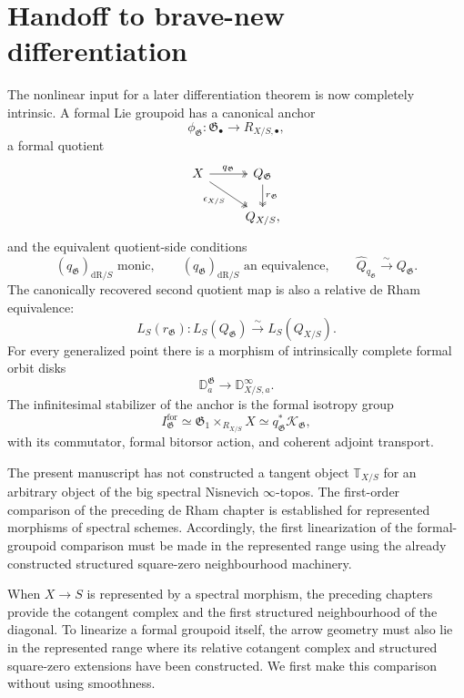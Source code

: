 \section{Handoff to brave-new differentiation}
\label{sec:flg-handoff}

The nonlinear input for a later differentiation theorem is now completely
intrinsic.  A formal Lie groupoid has a canonical anchor
\[
    \phi_{\mathfrak G}:
    \mathfrak G_\bullet
    \longrightarrow
    R_{X/S,\bullet},
\]
a formal quotient
\[
\begin{tikzcd}
X \arrow[r,two heads,"q_{\mathfrak G}"]
  \arrow[dr,two heads,"\epsilon_{X/S}"'] &
Q_{\mathfrak G}
  \arrow[d,two heads,"r_{\mathfrak G}"]\\
&Q_{X/S},
\end{tikzcd}
\]
and the equivalent quotient-side conditions
\[
    (q_{\mathfrak G})_{\mathrm{dR}/S}
    \text{ monic},
    \qquad
    (q_{\mathfrak G})_{\mathrm{dR}/S}
    \text{ an equivalence},
    \qquad
    \widehat Q_{q_{\mathfrak G}}
    \xrightarrow{\sim}
    Q_{\mathfrak G}.
\]
The canonically recovered second quotient map is also a relative de Rham
equivalence:
\[
    L_S(r_{\mathfrak G}):
    L_S(Q_{\mathfrak G})
    \xrightarrow{\sim}
    L_S(Q_{X/S}).
\]
For every generalized point there is a morphism of intrinsically complete
formal orbit disks
\[
    \mathbb D^{\mathfrak G}_a
    \longrightarrow
    \mathbb D^\infty_{X/S,a}.
\]
The infinitesimal stabilizer of the anchor is the formal isotropy group
\[
    I^{\mathrm{for}}_{\mathfrak G}
    \simeq
    \mathfrak G_1\times_{R_{X/S}}X
    \simeq
    q_{\mathfrak G}^*\mathcal K_{\mathfrak G},
\]
with its commutator, formal bitorsor action, and coherent adjoint transport.

The present manuscript has not constructed a tangent object
$\mathbb T_{X/S}$ for an arbitrary object of the big spectral Nisnevich
$\infty$-topos.  The first-order comparison of the preceding de Rham chapter
is established for represented morphisms of spectral schemes.  Accordingly,
the first linearization of the formal-groupoid comparison must be made in the
represented range using the already constructed structured square-zero
neighbourhood machinery.

When $X\to S$ is represented by a spectral morphism, the preceding chapters
provide the cotangent complex and the first structured neighbourhood of the
diagonal.  To linearize a formal groupoid itself, the arrow geometry must also
lie in the represented range where its relative cotangent complex and
structured square-zero extensions have been constructed.  We first make this
comparison without using smoothness.

